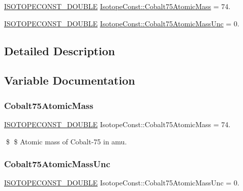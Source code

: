 \begin{DoxyCompactItemize}
\item 
\mbox{\hyperlink{group___isotope_const-_macros_ga8f45a7272ce02c0b4c65c44636ed719a}{I\+S\+O\+T\+O\+P\+E\+C\+O\+N\+S\+T\+\_\+\+D\+O\+U\+B\+LE}} \mbox{\hyperlink{group___isotope_const-_cobalt-_co75_ga96c8b8eaac6394be0ff018aca555e8c6}{Isotope\+Const\+::\+Cobalt75\+Atomic\+Mass}} = 74.
\item 
\mbox{\hyperlink{group___isotope_const-_macros_ga8f45a7272ce02c0b4c65c44636ed719a}{I\+S\+O\+T\+O\+P\+E\+C\+O\+N\+S\+T\+\_\+\+D\+O\+U\+B\+LE}} \mbox{\hyperlink{group___isotope_const-_cobalt-_co75_ga35db23e4bcc7226ea2a6600244383b76}{Isotope\+Const\+::\+Cobalt75\+Atomic\+Mass\+Unc}} = 0.
\end{DoxyCompactItemize}


\subsection{Detailed Description}


\subsection{Variable Documentation}
\mbox{\label{group___isotope_const-_cobalt-_co75_ga96c8b8eaac6394be0ff018aca555e8c6}} 
\subsubsection{\texorpdfstring{Cobalt75\+Atomic\+Mass}{Cobalt75AtomicMass}}
{\footnotesize\ttfamily \mbox{\hyperlink{group___isotope_const-_macros_ga8f45a7272ce02c0b4c65c44636ed719a}{I\+S\+O\+T\+O\+P\+E\+C\+O\+N\+S\+T\+\_\+\+D\+O\+U\+B\+LE}} Isotope\+Const\+::\+Cobalt75\+Atomic\+Mass = 74.}

\$ \$ Atomic mass of Cobalt-\/75 in amu. \mbox{\label{group___isotope_const-_cobalt-_co75_ga35db23e4bcc7226ea2a6600244383b76}} 
\subsubsection{\texorpdfstring{Cobalt75\+Atomic\+Mass\+Unc}{Cobalt75AtomicMassUnc}}
{\footnotesize\ttfamily \mbox{\hyperlink{group___isotope_const-_macros_ga8f45a7272ce02c0b4c65c44636ed719a}{I\+S\+O\+T\+O\+P\+E\+C\+O\+N\+S\+T\+\_\+\+D\+O\+U\+B\+LE}} Isotope\+Const\+::\+Cobalt75\+Atomic\+Mass\+Unc = 0.}

